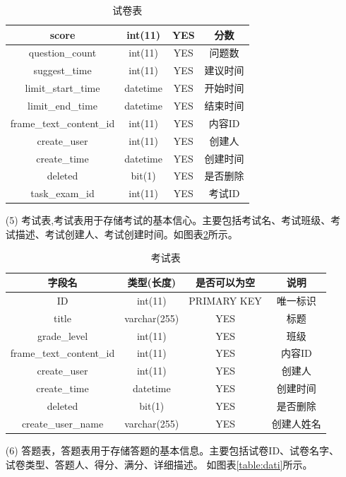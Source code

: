 \begin{enumerate}
\begin{table}[!htbp]
\begin{tabular}{|c|c|c|c|}
			\hline
			score & int(11) & YES & 分数 \\
			\hline
			question\_count & int(11) & YES & 问题数 \\
			\hline
			suggest\_time & int(11) & YES & 建议时间 \\
			\hline
			limit\_start\_time & datetime & YES & 开始时间 \\
			\hline
			limit\_end\_time & datetime & YES & 结束时间 \\
			\hline
			frame\_text\_content\_id & int(11) & YES & 内容ID \\
			\hline
			create\_user & int(11) & YES & 创建人 \\
			\hline
			create\_time & datetime & YES & 创建时间 \\
			\hline
			deleted & bit(1) & YES & 是否删除 \\
			\hline
			task\_exam\_id & int(11) & YES & 考试ID \\
			\hline
		\end{tabular}
		\caption{试卷表}
		\label{table:paper}
	\end{table}
	\item[(5)] 考试表,考试表用于存储考试的基本信心。主要包括考试名、考试班级、考试描述、考试创建人、考试创建时间。如图表\ref{table:exam}所示。
	\begin{table}[!htbp]
		\centering
		\begin{tabular}{|c|c|c|c|}
			\hline
			字段名 & 类型(长度) & 是否可以为空 & 说明 \\
			\hline
			ID & int(11) & PRIMARY KEY & 唯一标识 \\
			\hline
			title & varchar(255) & YES & 标题 \\
			\hline
			grade\_level & int(11) & YES & 班级 \\
			\hline
			frame\_text\_content\_id & int(11) & YES & 内容ID \\
			\hline
			create\_user & int(11) & YES & 创建人 \\
			\hline
			create\_time & datetime & YES & 创建时间 \\
			\hline
			deleted & bit(1) & YES & 是否删除 \\
			\hline
			create\_user\_name & varchar(255) & YES & 创建人姓名 \\
			\hline
		\end{tabular}
		\caption{考试表}
		\label{table:exam}
	\end{table}
	\item[(6)] 答题表，答题表用于存储答题的基本信息。主要包括试卷ID、试卷名字、试卷类型、答题人、得分、满分、详细描述。 如图表\ref{table:dati}所示。

\end{enumerate}
